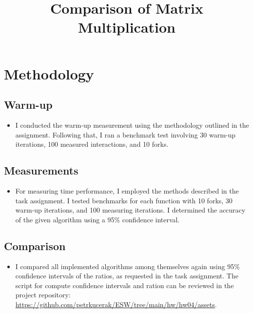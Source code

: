 \documentclass[onecolumn, conference]{IEEEtran}
\newcommand{\conciseItem}{\itemsep1pt \parskip0pt \parsep0pt}
\begin{document}
%
\title{Comparison of Matrix Multiplication}


\author{
}

\maketitle
\section{Methodology}
\subsection{Warm-up}
\begin{itemize}
	\conciseItem
	\item I conducted the warm-up measurement using the methodology outlined in the assignment. Following that, I ran a benchmark test involving 30 warm-up iterations, 100 measured interactions, and 10 forks.
\end{itemize}
\subsection{Measurements}
\begin{itemize}
	\conciseItem
	\item For measuring time performance, I employed the methods described in the task assignment. I tested benchmarks for each function with 10 forks, 30 warm-up iterations, and 100 measuring iterations. I determined the accuracy of the given algorithm using a 95\% confidence interval.
\end{itemize}
\subsection{Comparison}
\begin{itemize}
	\conciseItem
	\item I compared all implemented algorithms among themselves again using 95\% confidence intervals of the ratios, as requested in the task assignment. The script for compute confidence intervals and ration can be reviewed in the project repository: \url{https://github.com/petrkucerak/ESW/tree/main/hw/hw04/assets}.
\end{itemize}
\end{document}
